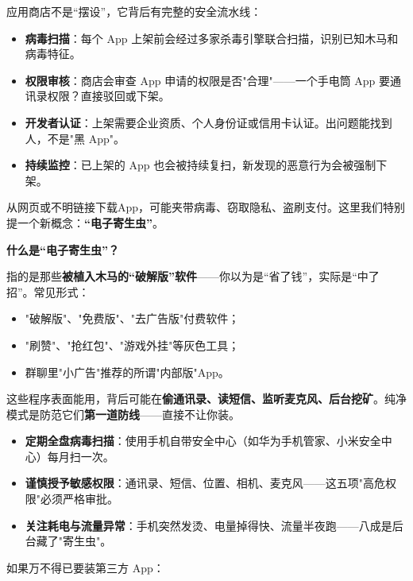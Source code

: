 
应用商店不是“摆设”，它背后有完整的安全流水线：

\begin{itemize}
  \item \textbf{病毒扫描}：每个 App 上架前会经过多家杀毒引擎联合扫描，识别已知木马和病毒特征。
  \item \textbf{权限审核}：商店会审查 App 申请的权限是否"合理"——一个手电筒 App 要通讯录权限？直接驳回或下架。
  \item \textbf{开发者认证}：上架需要企业资质、个人身份证或信用卡认证。出问题能找到人，不是"黑 App"。
  \item \textbf{持续监控}：已上架的 App 也会被持续复扫，新发现的恶意行为会被强制下架。
\end{itemize}


从网页或不明链接下载App，可能夹带病毒、窃取隐私、盗刷支付。这里我们特别提一个新概念：\textbf{“电子寄生虫”}。

\textbf{什么是“电子寄生虫”？}\par

指的是那些\textbf{被植入木马的“破解版”软件}——你以为是“省了钱”，实际是“中了招”。常见形式：

\begin{itemize}
  \item "破解版"、"免费版"、"去广告版"付费软件；
  \item "刷赞"、"抢红包"、"游戏外挂"等灰色工具；
  \item 群聊里"小广告"推荐的所谓"内部版"App。
\end{itemize}

这些程序表面能用，背后可能在\textbf{偷通讯录、读短信、监听麦克风、后台挖矿}。纯净模式是防范它们\textbf{第一道防线}——直接不让你装。


\begin{itemize}
  \item \textbf{定期全盘病毒扫描}：使用手机自带安全中心（如华为手机管家、小米安全中心）每月扫一次。
  \item \textbf{谨慎授予敏感权限}：通讯录、短信、位置、相机、麦克风——这五项"高危权限"必须严格审批。
  \item \textbf{关注耗电与流量异常}：手机突然发烫、电量掉得快、流量半夜跑——八成是后台藏了"寄生虫"。
\end{itemize}

如果万不得已要装第三方 App：

